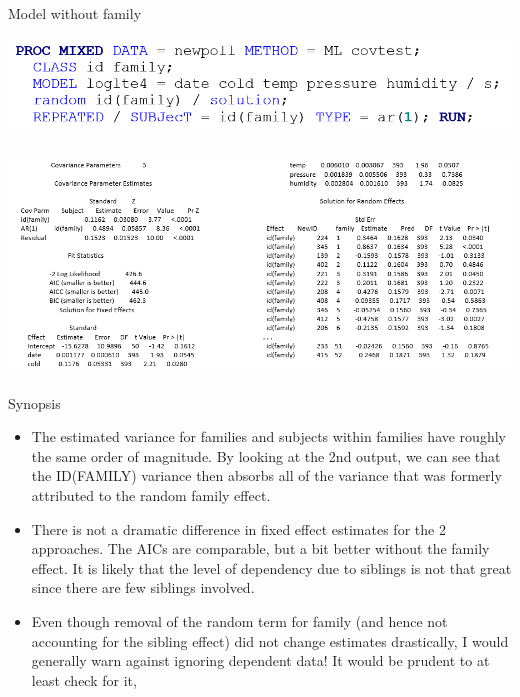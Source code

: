 \documentclass[
  9pt,
  ignorenonframetext,
]{beamer}
\begin{document}
\begin{frame}{Model without family}
\protect\hypertarget{model-without-family}{}
\begin{center}\includegraphics[width=1\linewidth]{figs_L10/f5} \end{center}

\begin{center}\includegraphics[width=1\linewidth]{figs_L10/f6} \end{center}
\end{frame}

\begin{frame}{Synopsis}
\protect\hypertarget{synopsis}{}
\begin{itemize}
\item
  The estimated variance for families and subjects within families have
  roughly the same order of magnitude. By looking at the 2nd output, we
  can see that the ID(FAMILY) variance then absorbs all of the variance
  that was formerly attributed to the random family effect.
\item
  There is not a dramatic difference in fixed effect estimates for the 2
  approaches. The AICs are comparable, but a bit better without the
  family effect. It is likely that the level of dependency due to
  siblings is not that great since there are few siblings involved.
\item
  Even though removal of the random term for family (and hence not
  accounting for the sibling effect) did not change estimates
  drastically, I would generally warn against ignoring dependent data!
  It would be prudent to at least check for it,
\end{itemize}
\end{frame}
\end{document}
